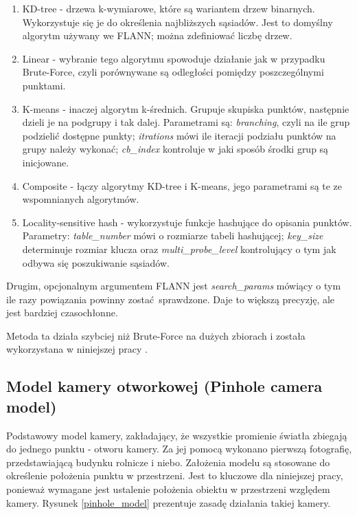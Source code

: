 \documentclass[12pt,twoside,polish]{article}
\begin{document}
\begin{enumerate}
	\item KD-tree - drzewa k-wymiarowe, które są wariantem drzew binarnych. Wykorzystuje się je do określenia najbliższych sąsiadów. Jest to domyślny algorytm używany we FLANN; można zdefiniować liczbę drzew.
	\item Linear - wybranie tego algorytmu spowoduje działanie jak w przypadku Brute-Force, czyli porównywane są odległości pomiędzy poszczególnymi punktami.
	\item K-means - inaczej algorytm k-średnich. Grupuje skupiska punktów, następnie dzieli je na podgrupy i tak dalej. Parametrami są: \emph{branching}, czyli na ile grup podzielić dostępne punkty; \emph{itrations} mówi ile iteracji podziału punktów na grupy należy wykonać; \emph{cb\_index} kontroluje w jaki sposób środki grup są inicjowane.
	\item Composite - łączy algorytmy KD-tree i K-means, jego parametrami są te ze wspomnianych algorytmów.
	\item Locality-sensitive hash - wykorzystuje funkcje hashujące do opisania punktów. Parametry: \emph{table\_number} mówi o rozmiarze tabeli hashującej; \emph{key\_size} determinuje rozmiar klucza oraz \emph{multi\_probe\_level} kontrolujący o tym jak odbywa się poszukiwanie sąsiadów.
\end{enumerate}

Drugim, opcjonalnym argumentem FLANN jest \emph{search\_params} mówiący o tym ile razy powiązania powinny zostać sprawdzone. Daje to większą precyzję, ale jest bardziej czasochłonne.

Metoda ta działa szybciej niż Brute-Force na dużych zbiorach i została wykorzystana w niniejszej pracy \cite[s.575]{learnopencv}.


\subsection[Model kamery otworkowej]{Model kamery otworkowej (Pinhole camera model)}
Podstawowy model kamery, zakładający, że wszystkie promienie światła zbiegają do jednego punktu - otworu kamery. Za jej pomocą wykonano pierwszą fotografię, przedstawiającą budynku rolnicze i niebo. Założenia modelu są stosowane do określenie położenia punktu w przestrzeni. Jest to kluczowe dla niniejszej pracy, ponieważ wymagane jest ustalenie położenia obiektu w przestrzeni względem kamery. Rysunek \ref{pinhole_model} prezentuje zasadę działania takiej kamery.
\end{document}
